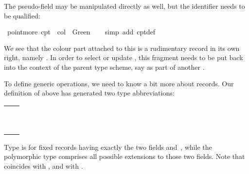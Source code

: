 \begin{isabellebody}
\begin{isamarkuptext}
  The  pseudo-field may be manipulated directly as well,
  but the identifier needs to be qualified:%
\end{isamarkuptext}%
\isamarkuptrue%
\isamarkupfalse%
\ {\isachardoublequoteopen}point{\isachardot}more\ cpt{}\ {\isacharequal}\ {\isasymlparr}col\ {\isacharequal}\ Green{\isasymrparr}{\isachardoublequoteclose}\isanewline
%
\isadelimproof
\ \ %
\endisadelimproof
%
\isatagproof
{}\isamarkupfalse%
\ {\isacharparenleft}simp\ add{\isacharcolon}\ cpt{}{\isacharunderscore}def{\isacharparenright}%
\endisatagproof
{\isafoldproof}%
%
\isadelimproof
%
\endisadelimproof
%
\begin{isamarkuptext}%
\noindent
  We see that the colour part attached to this  is a
  rudimentary record in its own right, namely .  In order to select or update , this fragment
  needs to be put back into the context of the parent type scheme, say
  as  part of another .

  To define generic operations, we need to know a bit more about
  records.  Our definition of  above has generated two
  type abbreviations:

  \medskip
  \begin{tabular}{l}
  \isa{point}~\isa{{\isacharequal}}~\isa{{\isasymlparr}Xcoord\ {\isacharcolon}{\isacharcolon}\ int{\isacharcomma}\ Ycoord\ {\isacharcolon}{\isacharcolon}\ int{\isasymrparr}} \\
  \isa{{\isacharprime}a\ point{\isacharunderscore}scheme}~\isa{{\isacharequal}}~\isa{{\isasymlparr}Xcoord\ {\isacharcolon}{\isacharcolon}\ int{\isacharcomma}\ Ycoord\ {\isacharcolon}{\isacharcolon}\ int{\isacharcomma}\ {\isasymdots}\ {\isacharcolon}{\isacharcolon}\ {\isacharprime}a{\isasymrparr}} \\
  \end{tabular}
  \medskip
  
\noindent
  Type  is for fixed records having exactly the two fields
   and~, while the polymorphic type  comprises all possible extensions to those two
  fields.  Note that  coincides with , and  with .


\end{isamarkuptext}
\end{isabellebody}
